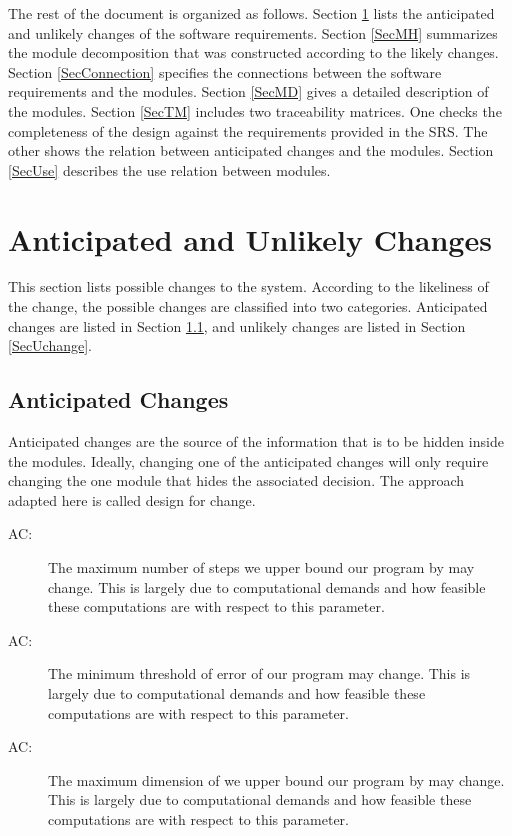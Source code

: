 \documentclass[12pt, titlepage]{article}
\newcounter{acnum}
\newcommand{\actheacnum}{AC\theacnum}
\begin{document}
The rest of the document is organized as follows. Section
\ref{SecChange} lists the anticipated and unlikely changes of the software
requirements. Section \ref{SecMH} summarizes the module decomposition that
was constructed according to the likely changes. Section \ref{SecConnection}
specifies the connections between the software requirements and the
modules. Section \ref{SecMD} gives a detailed description of the
modules. Section \ref{SecTM} includes two traceability matrices. One checks
the completeness of the design against the requirements provided in the SRS. The
other shows the relation between anticipated changes and the modules. Section
\ref{SecUse} describes the use relation between modules.

\section{Anticipated and Unlikely Changes} \label{SecChange}

This section lists possible changes to the system. According to the likeliness
of the change, the possible changes are classified into two
categories. Anticipated changes are listed in Section \ref{SecAchange}, and
unlikely changes are listed in Section \ref{SecUchange}.

\subsection{Anticipated Changes} \label{SecAchange}

Anticipated changes are the source of the information that is to be hidden
inside the modules. Ideally, changing one of the anticipated changes will only
require changing the one module that hides the associated decision. The approach
adapted here is called design for
change.

\begin{description}
\item[ \actheacnum \label{acNumSteps}:] The maximum number of steps we upper bound our program by may change. This is largely due to computational demands and how feasible these computations are with respect to this parameter.
\item[ \actheacnum \label{acMinError}:] The minimum threshold of error of our program may change. This is largely due to computational demands and how feasible these computations are with respect to this parameter.
\item[ \actheacnum \label{acMaxDim}:] The maximum dimension of we upper bound our program by may change. This is largely due to computational demands and how feasible these computations are with respect to this parameter.
\end{description}
\end{document}
